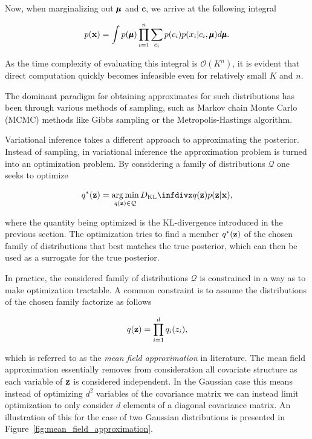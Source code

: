 Now, when marginalizing out $\pmb{\mu}$ and $\mathbf{c}$, we arrive at the following integral

$$p(\mathbf{x}) = \int p(\pmb{\mu}) \prod_{i=1}^{n} \sum_{c_i} p(c_i) p(x_i \vert c_i, \pmb{\mu}) d\pmb{\mu}.$$

As the time complexity of evaluating this integral is $\mathcal{O}(K^n)$, it is evident that direct computation quickly becomes infeasible even for relatively small $K$ and $n$.

The dominant paradigm for obtaining approximates for such distributions has been through various methods of sampling, such as Markov chain Monte Carlo (MCMC) methods like Gibbs sampling or the Metropolis-Hastings algorithm. 

Variational inference takes a different approach to approximating the posterior. Instead of sampling, in variational inference the approximation problem is turned into an optimization problem. By considering a family of distributions $\mathcal{Q}$ one seeks to optimize

\begin{equation}
q^{*}(\bz) = \argmin_{q(\bz) \in \mathcal{Q}} \dkl{q(\bz)}{p(\bz \vert \bx)},
\label{eq:vi}
\end{equation}

where the quantity being optimized is the KL-divergence introduced in the previous section. The optimization tries to find a member $q^{*}(\mathbf{z})$ of the chosen family of distributions that best matches the true posterior, which can then be used as a surrogate for the true posterior.

In practice, the considered family of distributions $\mathcal{Q}$ is constrained in a way as to make optimization tractable. A common constraint is to assume the distributions of the chosen family factorize as follows

$$q(\mathbf{z}) = \prod_{i=1}^{d} q_{i}(z_{i}),$$

which is referred to as the \textit{mean field approximation} in literature. The mean field approximation essentially removes from consideration all covariate structure as each variable of $\mathbf{z}$ is considered independent. In the Gaussian case this means instead of optimizing $d^2$ variables of the covariance matrix we can instead limit optimization to only consider $d$ elements of a diagonal covariance matrix. An illustration of this for the case of two Gaussian distributions is presented in Figure~\ref{fig:mean_field_approximation}.

